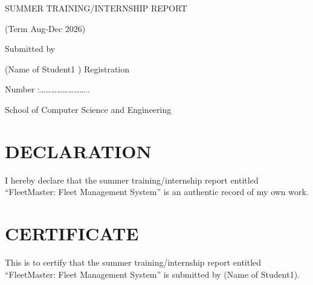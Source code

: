 \documentclass[12pt, a4paper]{report}
\begin{document}
\begin{titlepage}
    \centering
    \vspace*{2cm}

    {\fontsize{16}{19.2}\selectfont SUMMER TRAINING/INTERNSHIP REPORT\par}
    \vspace{0.5cm}
    {\fontsize{16}{19.2}\selectfont (Term Aug-Dec 2026)\par}

    \vspace{4cm}

    {\fontsize{12}{14.4}\selectfont Submitted by\par}
    \vspace{1.5cm}

    {\fontsize{12}{14.4}\selectfont (Name of Student1 ) \hspace{2cm} Registration\par}
    {\fontsize{12}{14.4}\selectfont Number :……………………..\par}

    \vfill

    {\fontsize{16}{19.2}\selectfont School of Computer Science and Engineering\par}

    \vspace*{2cm}
\end{titlepage}

\setcounter{page}{1}
\pagestyle{plain}

\chapter*{DECLARATION}
I hereby declare that the summer training/internship report entitled ``FleetMaster: Fleet Management System'' is an authentic record of my own work.

\clearpage

\chapter*{CERTIFICATE}
This is to certify that the summer training/internship report entitled ``FleetMaster: Fleet Management System'' is submitted by (Name of Student1).
\end{document}
